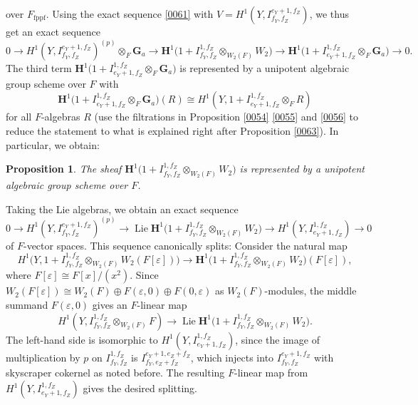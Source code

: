 \documentclass{amsart}
\newtheorem{Prop}[Thm]{Proposition}
\theoremstyle{remark}
\numberwithin{equation}{section}
\newcommand{\tensor}{\mathbin{\otimes}}
\newcommand{\fppf}{\mathrm{fppf}}
\newcommand{\Ga}{\mathbf{G}_{a}}
\newcommand{\alg}[1]{\mathbf{#1}}
\DeclareMathOperator{\Lie}{Lie}
\begin{document}
over $F_{\fppf}$.
Using the exact sequence \eqref{0061}
with $V = H^{1}(Y, I^{e_{Y} + 1, f_{Z}}_{f_{Y}, f_{Z}})$,
we thus get an exact sequence
	\[
			0
		\to
				H^{1}(Y, I^{e_{Y} + 1, f_{Z}}_{f_{Y}, f_{Z}})^{(p)}
			\tensor_{F}
				\Ga
		\to
			\alg{H}^{1} \bigl(
					1
				+
					I^{1, f_{Z}}_{f_{Y}, f_{Z}}
				\tensor_{W_{2}(F)}
					W_{2}
			\bigr)
		\to
			\alg{H}^{1} \bigl(
					1
				+
					I^{1, f_{Z}}_{e_{Y} + 1, f_{Z}}
				\tensor_{F}
					\Ga
			\bigr)
		\to
			0.
	\]
The third term
	$
		\alg{H}^{1} \bigl(
				1
			+
				I^{1, f_{Z}}_{e_{Y} + 1, f_{Z}}
			\tensor_{F}
				\Ga
		\bigr)
	$
is represented by a unipotent algebraic group scheme over $F$ with
	\[
			\alg{H}^{1} \bigl(
					1
				+
					I^{1, f_{Z}}_{e_{Y} + 1, f_{Z}}
				\tensor_{F}
					\Ga
			\bigr)(R)
		\cong
			H^{1}(Y, 1 + I^{1, f_{Z}}_{e_{Y} + 1, f_{Z}} \tensor_{F} R)
	\]
for all $F$-algebras $R$
(use the filtrations in Proposition \ref{0054} \eqref{0055} and \eqref{0056}
to reduce the statement to what is explained right after Proposition \ref{0063}).
In particular, we obtain:

\begin{Prop}
	The sheaf
		$
			\alg{H}^{1} \bigl(
					1
				+
					I^{1, f_{Z}}_{f_{Y}, f_{Z}}
				\tensor_{W_{2}(F)}
					W_{2}
			\bigr)
		$
	is represented by a unipotent algebraic group scheme over $F$.
\end{Prop}

Taking the Lie algebras, we obtain an exact sequence
	\begin{equation} \label{0009}
			0
		\to
			H^{1}(Y, I^{e_{Y} + 1, f_{Z}}_{f_{Y}, f_{Z}})^{(p)}
		\to
			\Lie
			\alg{H}^{1} \bigl(
					1
				+
					I^{1, f_{Z}}_{f_{Y}, f_{Z}}
				\tensor_{W_{2}(F)}
					W_{2}
			\bigr)
		\to
			H^{1}(Y, I^{1, f_{Z}}_{e_{Y} + 1, f_{Z}})
		\to
			0
	\end{equation}
of $F$-vector spaces.
This sequence canonically splits:
Consider the natural map
	\[
			H^{1} \bigl(
				Y,
					1
				+
					I^{1, f_{Z}}_{f_{Y}, f_{Z}}
				\tensor_{W_{2}(F)}
					W_{2}(F[\varepsilon])
			\bigr)
		\to
			\alg{H}^{1} \bigl(
					1
				+
					I^{1, f_{Z}}_{f_{Y}, f_{Z}}
				\tensor_{W_{2}(F)}
					W_{2}
			\bigr)(F[\varepsilon]),
	\]
where $F[\varepsilon] \cong F[x] / (x^{2})$.
Since $W_{2}(F[\varepsilon]) \cong W_{2}(F) \oplus F (\varepsilon, 0) \oplus F (0, \varepsilon)$
as $W_{2}(F)$-modules,
the middle summand $F (\varepsilon, 0)$ gives an $F$-linear map
	\[
			H^{1}(Y, I^{1, f_{Z}}_{f_{Y}, f_{Z}} \tensor_{W_{2}(F)} F)
		\to
			\Lie
			\alg{H}^{1} \bigl(
					1
				+
					I^{1, f_{Z}}_{f_{Y}, f_{Z}}
				\tensor_{W_{2}(F)}
					W_{2}
			\bigr).
	\]
The left-hand side is isomorphic to
$H^{1}(Y, I^{1, f_{Z}}_{e_{Y} + 1, f_{Z}})$,
since the image of multiplication by $p$ on $I^{1, f_{Z}}_{f_{Y}, f_{Z}}$ is
$I^{e_{Y} + 1, e_{Z} + f_{Z}}_{f_{Y}, e_{Z} + f_{Z}}$,
which injects into $I^{e_{Y} + 1, f_{Z}}_{f_{Y}, f_{Z}}$
with skyscraper cokernel as noted before.
The resulting $F$-linear map from $H^{1}(Y, I^{1, f_{Z}}_{e_{Y} + 1, f_{Z}})$
gives the desired splitting.
\end{document}
